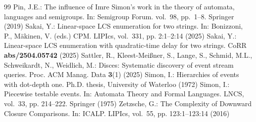 \documentclass[10pt,a4paper]{amsart}
\theoremstyle{plain}
\theoremstyle{definition}
\begin{document}
\begin{thebibliography}{99}
 Pin, J.E.: The influence of {I}mre {S}imon's work in the theory of automata, languages and semigroups. In: Semigroup Forum. vol.~98, pp.~1--8. Springer (2019)
 Sakai, Y.: Linear-space {LCS} enumeration for two strings. In: Bonizzoni, P., M{\"{a}}kinen, V. (eds.) {CPM}. LIPIcs, vol.~331, pp. 2:1--2:14 (2025)
 Sakai, Y.: Linear-space {LCS} enumeration with quadratic-time delay for two strings. CoRR \textbf{abs/2504.05742} (2025)
 Sattler, R., Kleest-Mei\ss{}ner, S., Lange, S., Schmid, M.L., Schweikardt, N., Weidlich, M.: Disces: Systematic discovery of event stream queries. Proc. ACM Manag. Data \textbf{3}(1) (2025)
 Simon, I.: Hierarchies of events with dot-depth one. Ph.D. thesis, University of Waterloo (1972)
 Simon, I.: Piecewise testable events. In: Automata Theory and Formal Languages. LNCS, vol.~33, pp. 214--222. Springer (1975)
 Zetzsche, G.: {The Complexity of Downward Closure Comparisons}. In: ICALP. LIPIcs, vol.~55, pp. 123:1--123:14 (2016)
\end{thebibliography}
\end{document}
